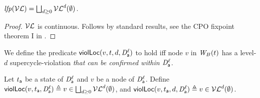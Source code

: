 \begin{proposition} \label{prop:computeLocLFP}
$\lfp{\lVFs} = \JOIN_{d \ge 0} \lVFs^{d} (\ewfg)$.
\end{proposition}
%
\begin{proof}
$\lVFs$ is continuous. Follows by standard results, \eg see the CPO fixpoint theorem I in 
\cite{DP02}.
\end{proof}










We define the predicate $\lviol{v}{d}{t}{\act}{\l}$ to hold iff node $v$ in $\wfg{B}{t}$ has a level-$d$ supercycle-violation
\emph{that can be confirmed within $\dsk{\act}{\l}$}.

\begin{definition}
\label{def:supercycle.violation.local}
Let $t_\act$ be a state of $\dsk{\act}{\l}$ and $v$ be a node of $\dsk{\act}{\l}$.
Define 
$\scVL{v}{t_\act}{\act}{\l} \df v \in \JOIN_{d \ge 0} \lVFs^{d} (\ewfg)$, and 
$\lviol{v}{d}{t_\act}{\act}{\l} \df v \in \lVFs^{d} (\ewfg)$.
\end{definition}











